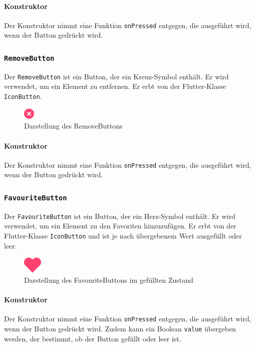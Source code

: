\documentclass{entwurfsheft}
\begin{document}
\begin{sloppypar}
\paragraph*{Konstruktor}
Der Konstruktor nimmt eine Funktion \texttt{onPressed} entgegen, die ausgeführt wird, wenn der Button gedrückt wird.

\subsubsection{\texttt{RemoveButton}}
\label{sec:removeButton}
Der \texttt{RemoveButton} ist ein Button, der ein Kreuz-Symbol enthält. Er wird verwendet, um ein Element zu entfernen. Er erbt von der Flutter-Klasse \texttt{IconButton}.
\begin{figure}[htp]
    \centering
    \includegraphics[height = .5cm]{images/presentationLayer/uiElements/removeButton.png}
    \caption{Darstellung des RemoveButtons}
\end{figure}
\paragraph*{Konstruktor}
Der Konstruktor nimmt eine Funktion \texttt{onPressed} entgegen, die ausgeführt wird, wenn der Button gedrückt wird.

\subsubsection{\texttt{FavouriteButton}}
\label{sec:favouriteButton}
Der \texttt{FavouriteButton} ist ein Button, der ein Herz-Symbol enthält. Er wird verwendet, um ein Element zu den Favoriten hinzuzufügen. Er erbt von der Flutter-Klasse \texttt{IconButton} und ist je nach übergebenem Wert ausgefüllt oder leer.
\begin{figure}[htp]
    \centering
    \includegraphics[height = .5cm]{images/presentationLayer/uiElements/favouriteButton.png}
    \caption{Darstellung des FavouriteButtons im gefüllten Zustand}
\end{figure}
\paragraph*{Konstruktor}
Der Konstruktor nimmt eine Funktion \texttt{onPressed} entgegen, die ausgeführt wird, wenn der Button gedrückt wird. Zudem kann ein Boolean \texttt{value} übergeben werden, der bestimmt, ob der Button gefüllt oder leer ist.


\end{sloppypar}
\end{document}
